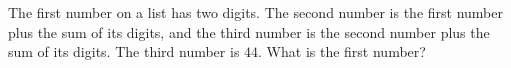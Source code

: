 The first number on a list has two digits. The second number is the first number plus the sum of its digits, and the third number is the second number plus the sum of its digits. The third number is $44$. What is the first number?
